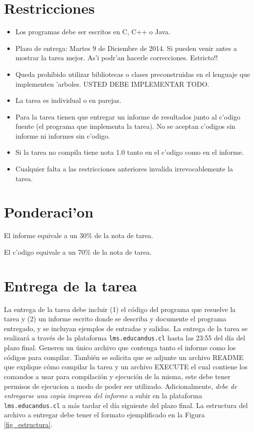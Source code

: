 \documentclass[11pt]{utalcaDoc}
\begin{document}


\section{Restricciones}

\begin{itemize}
\item Los programas debe ser escritos en C, C++ o Java.
\item Plazo de entrega: Martes 9 de Diciembre de 2014. Si pueden venir antes
a mostrar la tarea mejor. As'i podr'an hacerle correcciones. Estricto!!
\item Queda prohibido utilizar bibliotecas o clases preconstruidas en el lenguaje
    que implementen 'arboles.
    USTED DEBE IMPLEMENTAR TODO.
\item La tarea es individual o en parejas.
\item Para la tarea tienen que entregar un informe de resultados junto al c'odigo
    fuente (el programa que implementa la tarea). No se aceptan c'odigos sin
    informe ni informes sin c'odigo.
\item Si la tarea no compila tiene nota 1.0 tanto en el c'odigo como en el informe.
\item Cualquier falta a las restricciones anteriores invalida irrevocablemente
la tarea.
\end{itemize}



\section{Ponderaci'on}

El informe equivale a un 30\% de la nota de tarea.
    
El c'odigo equivale a un 70\% de la nota de tarea.



\section{Entrega de la tarea}

La entrega de la tarea debe incluir (1) el código del programa que resuelve
la tarea y (2) un informe escrito donde se describa y documente el programa
entregado, y se incluyan ejemplos de entradas y salidas. La entrega de la tarea
se realizará a través de la plataforma {\tt lms.educandus.cl} hasta las 23:55 del día
del plazo final. Generen un único archivo que contenga tanto el informe como
los códigos para compilar. También se solicita que se adjunte un archivo
README que explique cómo compilar la tarea y un archivo EXECUTE el
cual contiene los comandos a usar para compilación y ejecución de la misma,
este debe tener permisos de ejecucion a modo de poder ser utilizado.
Adicionalmente, \emph{debe de entregarse una copia impresa del informe} a
subir en la plataforma {\tt lms.educandus.cl} a más tardar el día siguiente
del plazo final. La estructura del archivo a entregar debe tener el formato
ejemplificado en la Figura \ref{fig_estructura}.
\end{document}
